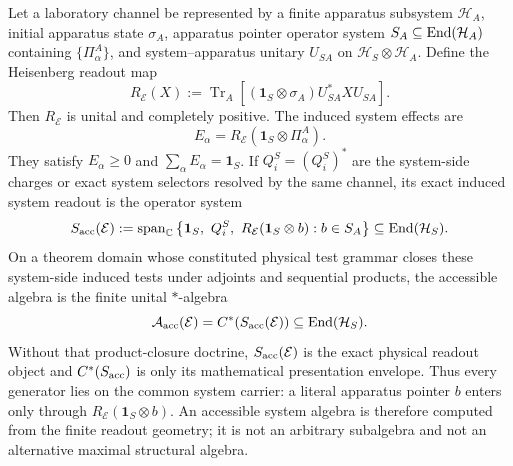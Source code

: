 \documentclass[12pt,a4paper]{article}
\begin{document}
\begin{theorem}
\label{p4:prop:accessible-algebras-selector-domain}
Let a laboratory channel be represented by a finite apparatus subsystem
\(\mathcal H_A\), initial apparatus state \(\sigma_A\), apparatus pointer
operator system \(S_A\subseteq\operatorname{End}(\mathcal H_A)\) containing
\(\{\Pi_\alpha^A\}\), and system--apparatus unitary \(U_{SA}\) on
\(\mathcal H_S\otimes\mathcal H_A\).  Define the Heisenberg readout map
\[
 R_{\mathcal E}(X)
 :=
 \operatorname{Tr}_A\!\left[
 (\mathbf1_S\otimes\sigma_A)U_{SA}^*XU_{SA}
 \right].
\]
Then \(R_{\mathcal E}\) is unital and completely positive.  The induced
system effects are
\begin{equation}
\label{p4:eq:induced-apparatus-effects}
  E_\alpha
  =R_{\mathcal E}(\mathbf1_S\otimes\Pi_\alpha^A).
\end{equation}
They satisfy \(E_\alpha\ge0\) and
\(\sum_\alpha E_\alpha=\mathbf1_S\).  If
\(Q_i^S=(Q_i^S)^*\) are the system-side charges or exact system selectors
resolved by the same channel, its exact
induced system readout is the operator system
\begin{equation}
\label{p4:eq:derived-accessible-operator-system}
 S_{\rm acc}(\mathcal E)
 :=
 \operatorname{span}_{\mathbb{C}}
 \left\{
 \mathbf1_S,\ Q_i^S,\
 R_{\mathcal E}(\mathbf1_S\otimes b):b\in S_A
 \right\}
 \subseteq\operatorname{End}(\mathcal H_S).
\end{equation}
On a theorem domain whose constituted physical test grammar closes these
system-side induced tests under adjoints and sequential products, the
accessible algebra is the finite unital \(*\)-algebra
\begin{equation}
\label{p4:eq:derived-accessible-algebra}
  \mathcal A_{\rm acc}(\mathcal E)
  =
  C^*\!\left(S_{\rm acc}(\mathcal E)\right)
  \subseteq\operatorname{End}(\mathcal H_S).
\end{equation}
Without that product-closure doctrine,
\(S_{\rm acc}(\mathcal E)\) is the exact physical readout object and
\(C^*(S_{\rm acc})\) is only its mathematical presentation envelope.  Thus
every generator lies on the common system carrier: a literal apparatus
pointer \(b\) enters only through
\(R_{\mathcal E}(\mathbf1_S\otimes b)\).  An accessible system algebra is
therefore computed from the finite readout geometry; it is not an arbitrary
subalgebra and not an alternative maximal structural algebra.
\end{theorem}
\end{document}
